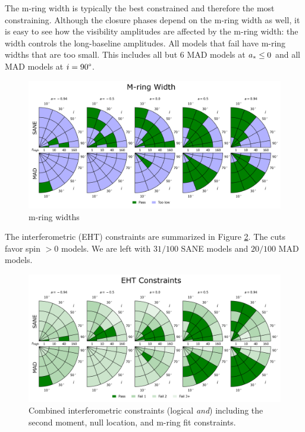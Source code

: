 The m-ring width is typically the best constrained and therefore the most constraining.  Although the closure phases depend on the m-ring width as well, it is easy to see how the visibility amplitudes are affected by the m-ring width: the width controls the long-baseline amplitudes.  All models that fail have m-ring widths that are too small.  This includes all but 6 MAD models at $a_* \le 0$ and all MAD models at $i = 90\degree$.

\begin{figure}
  \centering
  \includegraphics[width=\columnwidth]{./figures/Mring_w_Constraints.png}
  \caption{m-ring widths}
  \label{fig:cmp_m-ring_width}
\end{figure}


The interferometric (EHT) constraints are summarized in Figure \ref{fig:all_EHT_constraints}.  The cuts favor spin $> 0$ models.
We are left with $31/100$ SANE models and $20/100$ MAD models.

\begin{figure}
  \centering
    \includegraphics[width=\columnwidth]{./figures/Interferometric_Constraints.png}
  \caption{Combined interferometric constraints (logical {\em and}) including the second moment, null location, and m-ring fit constraints.}
  \label{fig:all_EHT_constraints}
\end{figure}

